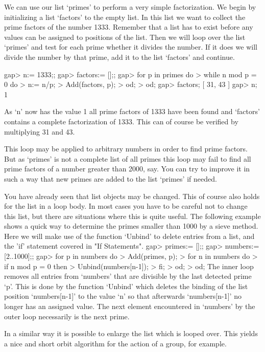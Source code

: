 We can use  our list `primes' to perform a very simple factorization.  We
begin by  initializing a list `factors' to the empty list.   In this list
we want to collect the prime factors of the number 1333.  Remember that a
list has to exist  before any values  can be assigned to positions of the
list.  Then we  will loop over the list `primes' and  test for each prime
whether it divides the  number.  If it does we will  divide the number by
that prime, add it to the list `factors' and continue.

\beginexample
gap> n:= 1333;;
gap> factors:= [];;
gap> for p in primes do
>       while n mod p = 0 do
>          n:= n/p;
>          Add(factors, p);
>       od;
>    od;
gap> factors;
[ 31, 43 ]
gap> n;
1
\endexample

As `n' now has the value 1 all prime factors  of 1333 have been found and
`factors' contains a complete factorization of  1333.  This can of course
be verified by multiplying 31 and 43.

This loop  may  be applied  to arbitrary  numbers in order  to find prime
factors.  But  as `primes' is not a complete list of all primes this loop
may fail  to find all prime factors of  a number greater than 2000,  say.
You  can try to improve it in such a way that new primes are added to the
list `primes' if needed.

You have already seen that list objects may be  changed.   This of
course also holds  for the  list in a loop body.  In most  cases  you have to be
careful not  to change this list, but there are situations  where this is
quite useful.  The following example  shows a quick way  to determine the
primes smaller than 1000 by a sieve method.  Here we will make use of the
function `Unbind' to delete entries from a list, and the 'if'
statement covered in "If Statements".
\beginexample
gap> primes:= [];;
gap> numbers:= [2..1000];;
gap> for p in numbers do
>       Add(primes, p);
>       for n in numbers do
>          if n mod p = 0 then
>             Unbind(numbers[n-1]);
>          fi;
>       od;
>    od;
\endexample
The inner loop  removes all entries from `numbers' that are  divisible by
the last detected prime `p'.  This is done by the function `Unbind' which
deletes the binding of the list position  `numbers[n-1]' to the value `n'
so that afterwards `numbers[n-1]' no longer has  an  assigned value.  The
next  element encountered in `numbers'  by the outer  loop necessarily is
the next prime.

In a similar way it is possible to enlarge the list which is looped over.
This yields a nice and short orbit  algorithm for the  action of a group,
for example.

